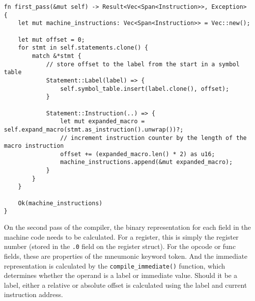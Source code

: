 \begin{lstlisting}
fn first_pass(&mut self) -> Result<Vec<Span<Instruction>>, Exception> {
    let mut machine_instructions: Vec<Span<Instruction>> = Vec::new();

    let mut offset = 0;
    for stmt in self.statements.clone() {
        match &*stmt {
            // store offset to the label from the start in a symbol table
            Statement::Label(label) => {
                self.symbol_table.insert(label.clone(), offset);
            }

            Statement::Instruction(..) => {
                let mut expanded_macro = self.expand_macro(stmt.as_instruction().unwrap())?;
                // increment instruction counter by the length of the macro instruction
                offset += (expanded_macro.len() * 2) as u16;
                machine_instructions.append(&mut expanded_macro);
            }
        }
    }

    Ok(machine_instructions)
}
\end{lstlisting}

On the second pass of the compiler, the binary representation for each field in the machine code needs to be calculated. For a register, this is simply the register number (stored in the \texttt{.0} field on the register struct). For the opcode or func fields, these are properties of the mneumonic keyword token. And the immediate representation is calculated by the \texttt{compile\_immediate()} function, which determines whether the operand is a label or immediate value. Should it be a label, either a relative or absolute offset is calculated using the label and current instruction address.

